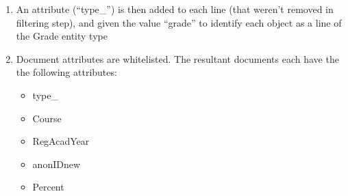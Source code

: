 \begin{enumerate}
  \item An attribute (``type\_'') is then added to each line (that weren't removed in filtering step), and given the value ``grade'' to identify each object as a line of the Grade entity type
  \item Document attributes are whitelisted. The resultant documents each have the the following attributes:
        \begin{itemize}
          \item type\_
          \item Course
          \item RegAcadYear
          \item anonIDnew
          \item Percent
        \end{itemize}
\end{enumerate}

